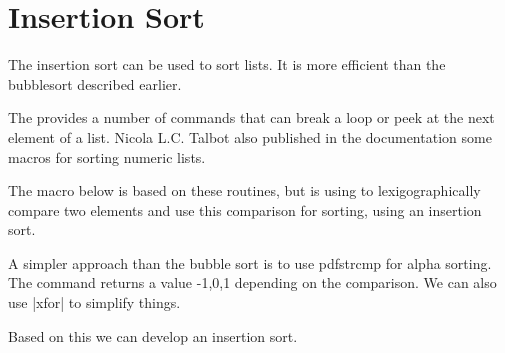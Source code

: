 \chapter{Insertion Sort}

The insertion sort can be used to sort lists. It is more efficient than the bubblesort described earlier. 

The  provides a number of commands that can break a loop or peek at the next element of a list. Nicola L.C. Talbot  also published in the documentation some macros for sorting numeric lists.

The macro below is based on these routines, but is using  to lexigographically compare two elements and use this comparison for sorting, using an insertion sort.

\begin{teXXX}
\makeatletter
\newtoks\tmptok
\newcommand{\insertinto}[2]{%
   \def\nlst{}%
   \@for\n:=#2\do{%
   \expandafter\tmptok\expandafter{\nlst}%
   \def\temp{\pdfstrcmp{\n}{#1}}
   \ifnum\temp>0\relax
     \edef\newstuff{#1,\n}%
     \@endfortrue
   \else
     \edef\newstuff{\n}%
   \fi
   \ifx\nlst\@empty
     \edef\nlst{\newstuff}%
   \else
     \edef\nlst{\the\tmptok,\newstuff}%
   \fi
   }%
   \if@endfor
   \ifx\@forremainder\@empty
   \else
     \expandafter\tmptok\expandafter{\nlst}%
     \edef\nlst{\the\tmptok,\@forremainder}%
   \fi
   \else
   \expandafter\tmptok\expandafter{\nlst}%
      \ifx\nlst\@empty
         \edef\nlst{#1}%
      \fi
   \fi
   \global\let#2=\nlst
}
\end{teXXX}


A simpler approach than the bubble sort is to use pdfstrcmp for alpha sorting. The command returns a value -1,0,1 depending on the comparison. We can also use |xfor| to simplify things.

Based on this we can develop an insertion sort.


